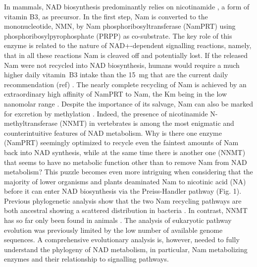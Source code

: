 \documentclass[paper=a4, 12pt]{scrartcl}
\begin{document}
In mammals, NAD biosynthesis predominantly relies on nicotinamide \cite{Bogan2008}, a form of vitamin B3, as precursor. In the first step, Nam is converted to the mononucleotide, NMN, by Nam phosphoribosyltransferase (NamPRT) using phosphoribosylpyrophosphate (PRPP) as co-substrate. The key role of this enzyme is related to the nature of NAD+-dependent signalling reactions, namely, that in all these reactions Nam is cleaved off and potentially lost. If the released Nam were not recycled into NAD biosynthesis, humans would require a much higher daily vitamin B3 intake than the 15 mg that are the current daily recommendation (ref) . The nearly complete recycling of Nam is achieved by an extraordinary high affinity of NamPRT to Nam, the Km being in the low nanomolar range \cite{Burgos2008}. Despite the importance of its salvage, Nam can also be marked for excretion by methylation . Indeed, the presence of nicotinamide N-methyltransferase (NNMT) in vertebrates \cite{Gossmann2012} is among the most enigmatic and counterintuitive features of NAD metabolism. Why is there one enzyme (NamPRT) seemingly optimized to recycle even the faintest amounts of Nam back into NAD synthesis, while at the same time there is another one (NNMT) that seems to have no metabolic function other than to remove Nam from NAD metabolism? This puzzle becomes even more intriguing when considering that the majority of lower organisms and plants deaminated Nam to nicotinic acid (NA) before it can enter NAD biosynthesis via the Preiss-Handler pathway (Fig. 1). Previous phylogenetic analysis show that the two Nam recycling pathways are both ancestral showing a scattered distribution in bacteria \cite{Gazzaniga2009}. In contrast, NNMT has so far only been found in animals \cite{Gossmann2012}. The analysis of eukaryotic pathway evolution was previously limited by the low number of available genome sequences. A comprehensive evolutionary analysis is, however, needed to fully understand the phylogeny of NAD metabolism, in particular, Nam metabolizing enzymes and their relationship to signalling pathways.
\end{document}
